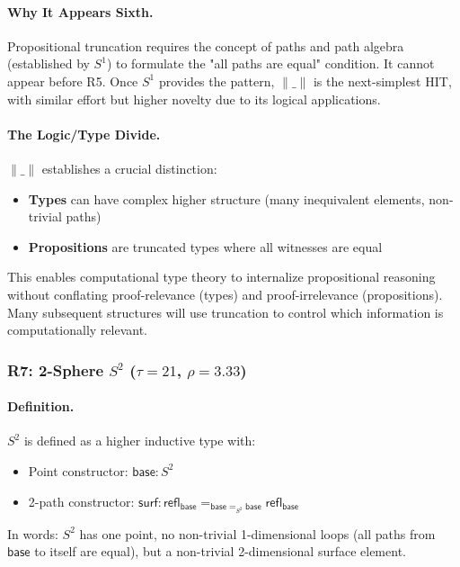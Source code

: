 \documentclass[11pt]{article}
\theoremstyle{definition}
\begin{document}
\paragraph{Why It Appears Sixth.}
Propositional truncation requires the concept of paths and path algebra (established by $S^1$) to formulate the "all paths are equal" condition. It cannot appear before R5. Once $S^1$ provides the pattern, $\|\_\|$ is the next-simplest HIT, with similar effort but higher novelty due to its logical applications.

\paragraph{The Logic/Type Divide.}
$\|\_\|$ establishes a crucial distinction:
\begin{itemize}
\item \textbf{Types} can have complex higher structure (many inequivalent elements, non-trivial paths)
\item \textbf{Propositions} are truncated types where all witnesses are equal
\end{itemize}

This enables computational type theory to internalize propositional reasoning without conflating proof-relevance (types) and proof-irrelevance (propositions). Many subsequent structures will use truncation to control which information is computationally relevant.

\subsubsection{R7: 2-Sphere $S^2$ ($\tau=21$, $\rho=3.33$)}

\paragraph{Definition.}
$S^2$ is defined as a higher inductive type with:
\begin{itemize}
\item Point constructor: $\mathsf{base} : S^2$  
\item 2-path constructor: $\mathsf{surf} : \mathsf{refl}_{\mathsf{base}} =_{\mathsf{base}=_{S^2}\mathsf{base}} \mathsf{refl}_{\mathsf{base}}$
\end{itemize}

In words: $S^2$ has one point, no non-trivial 1-dimensional loops (all paths from $\mathsf{base}$ to itself are equal), but a non-trivial 2-dimensional surface element.
\end{document}
